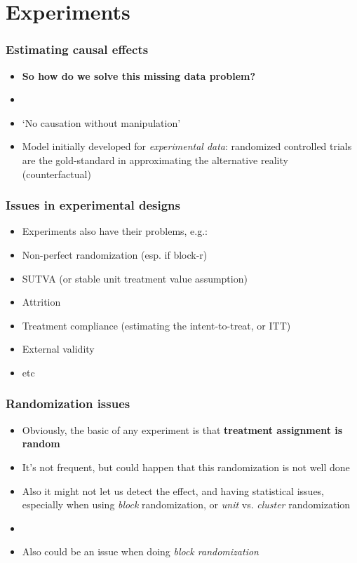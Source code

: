 \documentclass[aspectratio=43]{beamer}
\begin{document}
\section{Experiments}

\begin{frame}
\frametitle{Estimating causal effects}
\centering

\begin{itemize}
  \item \textbf{So how do we solve this missing data problem?}
  \item[]
  \item<2-> `No causation without manipulation'
  \item<3-> Model initially developed for \textit{experimental data}: randomized controlled trials are the gold-standard in approximating the alternative reality (counterfactual)
\end{itemize}

\end{frame}

\begin{frame}
\frametitle{Issues in experimental designs}
\centering

\begin{itemize}
  \item[] Experiments also have their problems, e.g.:
  \item Non-perfect randomization (esp. if block-r)
  \item SUTVA (or stable unit treatment value assumption)
  \item Attrition
  \item Treatment compliance (estimating the intent-to-treat, or ITT)
  \item External validity
  \item etc
\end{itemize}

\end{frame}

\begin{frame}
\frametitle{Randomization issues}
\centering

\begin{itemize}
  \item Obviously, the basic of any experiment is that \textbf{treatment assignment is random}
  \item It's not frequent, but could happen that this randomization is not well done
  \item Also it might not let us detect the effect, and having statistical issues, especially when using \textit{block} randomization, or \textit{unit} vs. \textit{cluster} randomization
  \item[]
  \item Also could be an issue when doing \textit{block randomization}
\end{itemize}

\end{frame}
\end{document}

